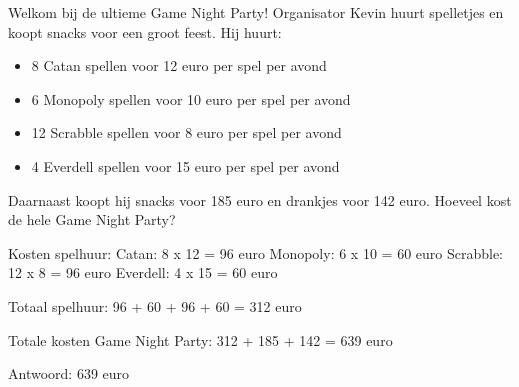 \begin{opgave}
Welkom bij de ultieme Game Night Party! Organisator Kevin huurt spelletjes en 
koopt snacks voor een groot feest. Hij huurt:
\begin{itemize}
\item 8 Catan spellen voor 12 euro per spel per avond
\item 6 Monopoly spellen voor 10 euro per spel per avond
\item 12 Scrabble spellen voor 8 euro per spel per avond
\item 4 Everdell spellen voor 15 euro per spel per avond
\end{itemize}
Daarnaast koopt hij snacks voor 185 euro en drankjes voor 142 euro. Hoeveel 
kost de hele Game Night Party?
\end{opgave}

\begin{oplossing}
Kosten spelhuur:
Catan: 8 x 12 = 96 euro
Monopoly: 6 x 10 = 60 euro
Scrabble: 12 x 8 = 96 euro
Everdell: 4 x 15 = 60 euro

Totaal spelhuur: 96 + 60 + 96 + 60 = 312 euro

Totale kosten Game Night Party:
312 + 185 + 142 = 639 euro

Antwoord: 639 euro
\end{oplossing}